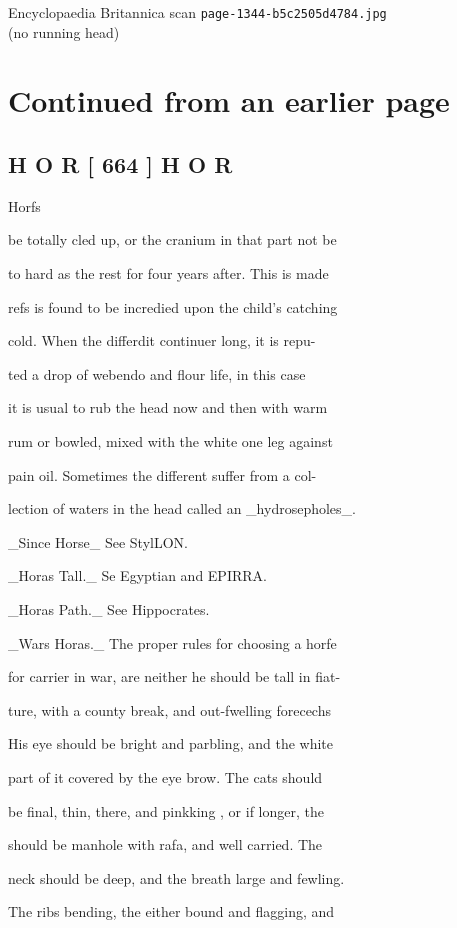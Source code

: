 \documentclass{article}
\begin{document}
\begin{center}
{\Large Encyclopaedia Britannica scan \texttt{page-1344-b5c2505d4784.jpg}}\\[0.5em]
(no running head)
\end{center}
\section*{Continued from an earlier page}
\subsection*{H O R [ 664 ] H O R}
Horfs

be totally cled up, or the cranium in that part not be

to hard as the rest for four years after. This is made

refs is found to be incredied upon the child’s catching

cold. When the differdit continuer long, it is repu-

ted a drop of webendo and flour life, in this case

it is usual to rub the head now and then with warm

rum or bowled, mixed with the white one leg against

pain oil. Sometimes the different suffer from a col-

lection of waters in the head called an \_hydrosepholes\_.

\_Since Horse\_ See StylLON.

\_Horas Tall.\_ Se Egyptian and EPIRRA.

\_Horas Path.\_ See Hippocrates.

\_Wars Horas.\_ The proper rules for choosing a horfe

for carrier in war, are neither he should be tall in fiat-

ture, with a county break, and out-fwelling forecechs

His eye should be bright and parbling, and the white

part of it covered by the eye brow. The cats should

be final, thin, there, and pinkking , or if longer, the

should be manhole with rafa, and well carried. The

neck should be deep, and the breath large and fewling.

The ribs bending, the either bound and flagging, and
\end{document}
